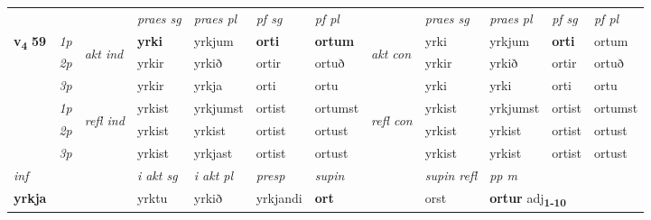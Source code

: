 \begin{longtable}[l]{X>{\footnotesize\itshape}llXXXXlXXXX}
 & &   & \textit{praes sg}  & \textit{praes pl}    & \textit{ pf sg} & \textit{pf pl} & & \textit{praes sg}  & \textit{praes pl}    & \textit{pf sg} & \textit{pf pl }  \\ \cmidrule{4-7} \cmidrule{9-12}
 \multirow{2}{*}{{{\textbf{v{\textsubscript{4}}} \Large{\textbf{59}}}}}  & 1p & \multirow{3}{*}{\begin{turn}{90}\textit{akt ind}\end{turn}} & \textbf{yrki} & yrkjum & \textbf{orti} & \textbf{ortum} & \multirow{3}{*}{\begin{turn}{90}\textit{akt con}\end{turn}} &yrki & yrkjum & \textbf{orti} & ortum\\*
 & 2p &  &  yrkir  & yrkið & ortir & ortuð & & yrkir & yrkið & ortir & ortuð \\*
 & 3p &  & yrkir & yrkja & orti & ortu & & yrki & yrki& orti & ortu \\*
\cmidrule{4-7} \cmidrule{9-12}
 & 1p & \multirow{3}{*}{\begin{turn}{90}\textit{refl ind}\end{turn}}  & yrkist & yrkjumst & ortist & ortumst & \multirow{3}{*}{\begin{turn}{90}\textit{refl con}\end{turn}}  &yrkist & yrkjumst & ortist & ortumst \\*
 & 2p &  & yrkist & yrkist & ortist & ortust & &yrkist & yrkist & ortist & ortust \\*
 & 3p  & & yrkist & yrkjast & ortist & ortust & & yrkist & yrkist& ortist & ortust \\*
\cmidrule{4-7} \cmidrule{9-12}

   {\textit{inf}} & &  & \textit{i akt sg} & \textit{i akt pl}   & \textit{presp} & \textit{supin} && \textit{supin refl} & \textit{pp m} \\*
  {\textbf{yrkja}} & && yrktu  & yrkið   & yrkjandi &  \textbf{ort} && orst & \multicolumn{2}{l}{\textbf{ortur} adj\textbf{\textsubscript{1-10}}} \\*


\end{longtable}
